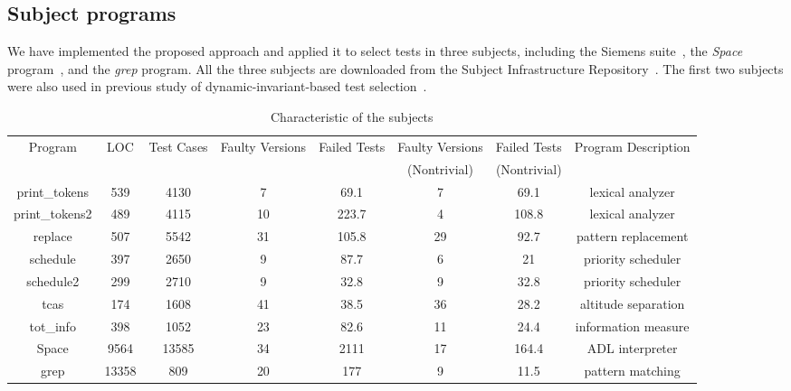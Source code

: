 \documentclass{sig-alternate}
\begin{document}
\subsection{Subject programs}

We have implemented the proposed approach and applied it to select
tests in three subjects, including the Siemens
suite~\cite{Hutchins94}, the {\it Space} program~\cite{Rothermel01},
and the {\it grep} program. All the three subjects are downloaded
from the Subject Infrastructure Repository~\cite{SIR}. The first two
subjects were also used in previous study of dynamic-invariant-based
test selection~\cite{Harder03}.



\begin{table}[t]
\caption{Characteristic of the subjects}\label{tab:subjects} \center
\begin{tabular}{|c|c|c|c|c|c|c|c|}
%

\hline  Program &   LOC &   Test Cases  &   Faulty Versions & Failed
Tests    &   Faulty Versions     &   Failed Tests
    &   Program Description \\
 & & & & & (Nontrivial) & (Nontrivial) & \\

\hline  print\_tokens   &   539 &   4130    &   7   &   69.1    &   7   &   69.1    &   lexical analyzer    \\
\hline  print\_tokens2  &   489 &   4115    &   10  &   223.7   &   4   &   108.8   &   lexical analyzer    \\
\hline  replace &   507 &   5542    &   31  &   105.8   &   29  &   92.7    &   pattern replacement \\
\hline  schedule    &   397 &   2650    &   9   &   87.7    &   6   &   21  &   priority scheduler  \\
\hline  schedule2   &   299 &   2710    &   9   &   32.8    &   9   &   32.8    &   priority scheduler  \\
\hline  tcas    &   174 &   1608    &   41  &   38.5    &   36  &   28.2    &   altitude separation \\
\hline  tot\_info &   398 &   1052    &   23  &   82.6    &   11  &   24.4    &   information measure \\
\hline  Space   &   9564    &   13585   &   34  &   2111    &   17  &   164.4   &   ADL interpreter \\
\hline  grep    &   13358   &   809 &   20  &   177 &   9   &   11.5    &   pattern matching    \\

\hline
\end{tabular}
\end{table}
\end{document}
